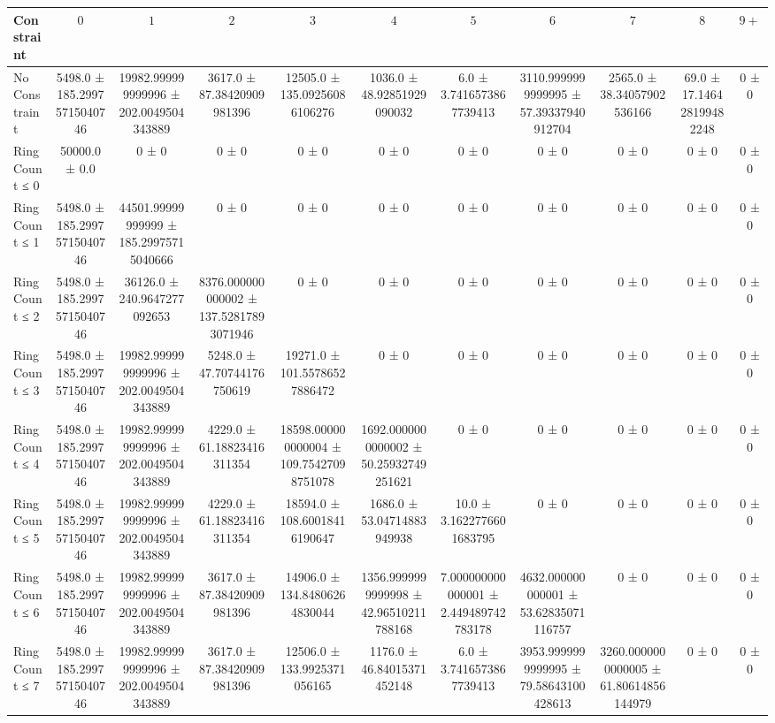\begin{table}[H]
    \centering
    \begin{tabular}{l c c c c c c c c c c}
        \toprule
        \textbf{Constraint} & $0$ & $1$ & $2$ & $3$ & $4$ & $5$ & $6$ & $7$ & $8$ & $9+$ \\
        \midrule
        No Constraint & 5498.0 ± 185.29975715040746 & 19982.999999999996 ± 202.0049504343889 & 3617.0 ± 87.38420909981396 & 12505.0 ± 135.09256086106276 & 1036.0 ± 48.92851929090032 & 6.0 ± 3.7416573867739413 & 3110.9999999999995 ± 57.39337940912704 & 2565.0 ± 38.34057902536166 & 69.0 ± 17.146428199482248 & 0 ± 0 \\
        Ring Count ≤ 0 & 50000.0 ± 0.0 & 0 ± 0 & 0 ± 0 & 0 ± 0 & 0 ± 0 & 0 ± 0 & 0 ± 0 & 0 ± 0 & 0 ± 0 & 0 ± 0 \\
        Ring Count ≤ 1 & 5498.0 ± 185.29975715040746 & 44501.99999999999 ± 185.29975715040666 & 0 ± 0 & 0 ± 0 & 0 ± 0 & 0 ± 0 & 0 ± 0 & 0 ± 0 & 0 ± 0 & 0 ± 0 \\
        Ring Count ≤ 2 & 5498.0 ± 185.29975715040746 & 36126.0 ± 240.9647277092653 & 8376.000000000002 ± 137.52817893071946 & 0 ± 0 & 0 ± 0 & 0 ± 0 & 0 ± 0 & 0 ± 0 & 0 ± 0 & 0 ± 0 \\
        Ring Count ≤ 3 & 5498.0 ± 185.29975715040746 & 19982.999999999996 ± 202.0049504343889 & 5248.0 ± 47.70744176750619 & 19271.0 ± 101.55786527886472 & 0 ± 0 & 0 ± 0 & 0 ± 0 & 0 ± 0 & 0 ± 0 & 0 ± 0 \\
        Ring Count ≤ 4 & 5498.0 ± 185.29975715040746 & 19982.999999999996 ± 202.0049504343889 & 4229.0 ± 61.18823416311354 & 18598.000000000004 ± 109.75427098751078 & 1692.0000000000002 ± 50.25932749251621 & 0 ± 0 & 0 ± 0 & 0 ± 0 & 0 ± 0 & 0 ± 0 \\
        Ring Count ≤ 5 & 5498.0 ± 185.29975715040746 & 19982.999999999996 ± 202.0049504343889 & 4229.0 ± 61.18823416311354 & 18594.0 ± 108.60018416190647 & 1686.0 ± 53.04714883949938 & 10.0 ± 3.1622776601683795 & 0 ± 0 & 0 ± 0 & 0 ± 0 & 0 ± 0 \\
        Ring Count ≤ 6 & 5498.0 ± 185.29975715040746 & 19982.999999999996 ± 202.0049504343889 & 3617.0 ± 87.38420909981396 & 14906.0 ± 134.84806264830044 & 1356.9999999999998 ± 42.96510211788168 & 7.000000000000001 ± 2.449489742783178 & 4632.000000000001 ± 53.62835071116757 & 0 ± 0 & 0 ± 0 & 0 ± 0 \\
        Ring Count ≤ 7 & 5498.0 ± 185.29975715040746 & 19982.999999999996 ± 202.0049504343889 & 3617.0 ± 87.38420909981396 & 12506.0 ± 133.9925371056165 & 1176.0 ± 46.84015371452148 & 6.0 ± 3.7416573867739413 & 3953.9999999999995 ± 79.58643100428613 & 3260.0000000000005 ± 61.80614856144979 & 0 ± 0 & 0 ± 0 \\

\end{tabular}
\end{table}
